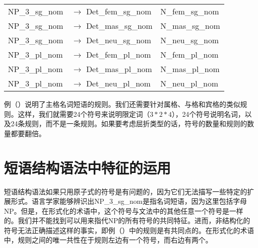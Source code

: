 \begin{tabular}[t]{@{}l@{ }l@{~~}l}
NP\_3\_sg\_nom  & $\to$ Det\_fem\_sg\_nom & N\_fem\_sg\_nom \\
NP\_3\_sg\_nom  & $\to$ Det\_mas\_sg\_nom & N\_mas\_sg\_nom \\
NP\_3\_sg\_nom  & $\to$ Det\_neu\_sg\_nom & N\_neu\_sg\_nom \\
NP\_3\_pl\_nom  & $\to$ Det\_fem\_pl\_nom & N\_fem\_pl\_nom \\
NP\_3\_pl\_nom  & $\to$ Det\_mas\_pl\_nom & N\_mas\_pl\_nom \\
NP\_3\_pl\_nom  & $\to$ Det\_neu\_pl\_nom & N\_neu\_pl\_nom \\[2mm]
\end{tabular}
\z
例（）说明了主格名词短语的规则。我们还需要针对属格、与格和宾格的类似规则。这样，我们就需要24个符号来说明限定词（$3*2*4$），24个符号说明名词，以及24条规则，而不是一条规则。如果要考虑屈折类型的话，符号的数量和规则的数量都要翻倍。

\section{短语结构语法中特征的运用}
\label{sec-PSG-Merkmale}

短语结构语法如果只用原子式的符号是有问题的，因为它们无法描写一些特定的扩展形式。语言学家能够辨识出NP\_3\_sg\_nom是指名词短语，因为这里包括字母NP。但是，在形式化的术语中，这个符号与文法中的其他任意一个符号是一样的。我们并不能找到可以用来指代NP的所有符号的共同特征。进而，非结构化的符号无法正确描述这样的事实，即例（）中的规则是有共同点的。在形式化的术语中，规则之间的唯一共性在于规则左边有一个符号，而右边有两个。

